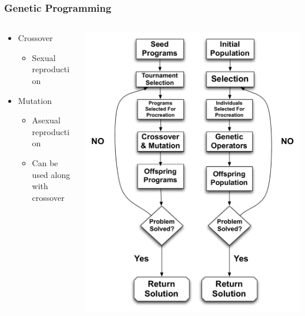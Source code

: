 \documentclass{beamer}
\begin{document}
\begin{frame}
	\frametitle{Genetic Programming}

\begin{columns}[T]
\begin{column}{0.5\textwidth}

\begin{itemize}	
	\item Crossover
	\\
	\begin{itemize}
		\item Sexual reproduction
	\end{itemize}
	\item Mutation
	\\
	\begin{itemize}
		\item Asexual reproduction
		\item Can be used along with crossover
	\end{itemize}
\end{itemize}
\end{column}
\begin{column}{0.5\textwidth}
   \includegraphics[height=0.85\textheight]{Illustrations/GP3.pdf}
       \\
\end{column}
\end{columns}

\end{frame}
\end{document}
